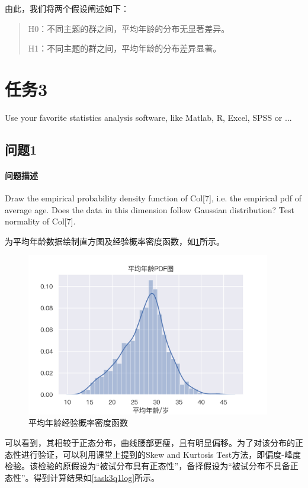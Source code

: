 \documentclass[a4paper,12pt]{article}
\begin{document}
    由此，我们将两个假设阐述如下：
    \begin{quote}
        H0：不同主题的群之间，平均年龄的分布无显著差异。

        H1：不同主题的群之间，平均年龄的分布差异显著。
    \end{quote}

    \section{任务3} %
    Use your favorite statistics analysis software, like Matlab, R, Excel, SPSS or ...
    \subsection{问题1} %
    \paragraph{问题描述} Draw the empirical probability density function of Col[7], i.e. the empirical pdf of average age. Does the data in this dimension follow Gaussian distribution? Test normality of Col[7].

    为平均年龄数据绘制直方图及经验概率密度函数，如\cref{fig:task3-pdf}所示。
    \begin{figure}[htbp]
        \centering
        \includegraphics[width=0.95\textwidth]{task3-pdf}
        \caption{平均年龄经验概率密度函数}
        \label{fig:task3-pdf}
    \end{figure}

    可以看到，其相较于正态分布，曲线腰部更瘦，且有明显偏移。为了对该分布的正态性进行验证，可以利用课堂上提到的Skew and Kurtosis Test方法\cite{hypotest}，即偏度-峰度检验。该检验的原假设为“被试分布具有正态性”，备择假设为“被试分布不具备正态性”\cite{zhengtai}。得到计算结果如\cref{task3q1log}所示。
    
\end{document}
